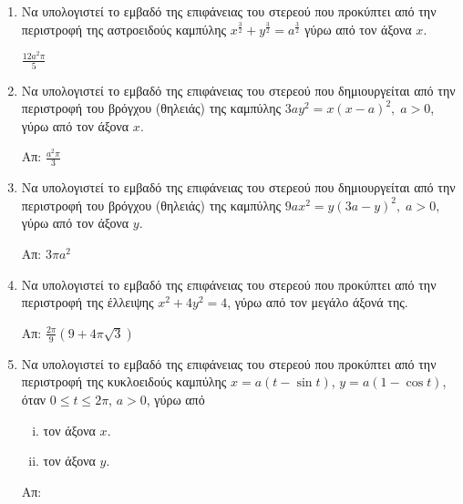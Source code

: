 


\everymath{\displaystyle}
\pagestyle{askhseis}



\begin{center}
  \minibox{\large\bfseries \textcolor{Col1}{Εμβαδό Επιφάνειας από Περιστροφή}}
\end{center}

\vspace{\baselineskip}


\begin{enumerate}

\item Να υπολογιστεί το εμβαδό της επιφάνειας του στερεού που προκύπτει από την
	περιστροφή της αστροειδούς καμπύλης $ x^{\frac{3}{2}} + y^{\frac{3}{2}} 
    = a^{\frac{3}{2}} $ γύρω από τον άξονα $x$. 

	\hfill $ \frac{12 a^{2}\pi}{5}  $ 

\item Να υπολογιστεί το εμβαδό της επιφάνειας του στερεού που δημιουργείται από 
    την περιστροφή του βρόγχου (θηλειάς) της καμπύλης $ 3ay^{2} = x(x-a)^{2}, \; a>0 $,
    γύρω από τον άξονα $x$.

\hfill Απ: $ \frac{a^{2} \pi}{3}  $

\item Να υπολογιστεί το εμβαδό της επιφάνειας του στερεού που δημιουργείται από 
    την περιστροφή του βρόγχου (θηλειάς) της καμπύλης $ 9ax^{2} = y(3a-y)^{2}, \;
    a>0, $ γύρω από τον άξονα $y$.

    \hfill Απ: $ 3 \pi a^{2} $ 


\item Να υπολογιστεί το εμβαδό της επιφάνειας του στερεού που προκύπτει από την 
    περιστροφή της έλλειψης $ x^{2} + 4y^{2} = 4 $, γύρω από τον μεγάλο άξονά της.

	\hfill Απ: $ \frac{2 \pi}{9} (9 + 4 \pi \sqrt{3}) $

\item Να υπολογιστεί το εμβαδό της επιφάνειας του στερεού που προκύπτει από την 
    περιστροφή της κυκλοειδούς καμπύλης $ x = a (t - \sin{t}) $, $ y 
    = a(1 - \cos{t}) $, όταν $ 0 \leq t \leq 2 \pi $, $ a>0 $, γύρω από
	\begin{enumerate}[i)]
	\item 	τον άξονα $x$.
	\item τον άξονα $y$.
\end{enumerate}	

\hfill Απ:  

		 
\end{enumerate}


